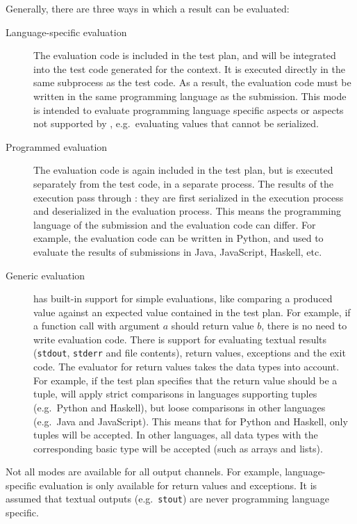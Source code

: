 \documentclass[5p,number]{elsarticle}
\begin{document}
    Generally, there are three ways in which a result can be evaluated:
    \begin{description}
        \item[Language-specific evaluation] The evaluation code is included in the test plan, and will be integrated into the test code generated for the context.
        It is executed directly in the same subprocess as the test code.
        As a result, the evaluation code must be written in the same programming language as the submission.
        This mode is intended to evaluate programming language specific aspects or aspects not supported by \tested{}, e.g.\ evaluating values that cannot be serialized.
        \item[Programmed evaluation] The evaluation code is again included in the test plan, but is executed separately from the test code, in a separate process.
        The results of the execution pass through \tested{}: they are first serialized in the execution process and deserialized in the evaluation process.
        This means the programming language of the submission and the evaluation code can differ.
        For example, the evaluation code can be written in Python, and used to evaluate the results of submissions in Java, JavaScript, Haskell, etc.
        \item[Generic evaluation] \tested{} has built-in support for simple evaluations, like comparing a produced value against an expected value contained in the test plan.
        For example, if a function call with argument $a$ should return value $b$, there is no need to write evaluation code.
        There is support for evaluating textual results (\texttt{stdout}, \texttt{stderr} and file contents), return values, exceptions and the exit code.
        The evaluator for return values takes the data types into account.
        For example, if the test plan specifies that the return value should be a tuple, \tested{} will apply strict comparisons in languages supporting tuples (e.g.\ Python and Haskell), but loose comparisons in other languages (e.g.\ Java and JavaScript).
        This means that for Python and Haskell, only tuples will be accepted.
        In other languages, all data types with the corresponding basic type will be accepted (such as arrays and lists).
    \end{description}

    Not all modes are available for all output channels.
    For example, language-specific evaluation is only available for return values and exceptions.
    It is assumed that textual outputs (e.g.\ \texttt{stout}) are never programming language specific.
\end{document}
